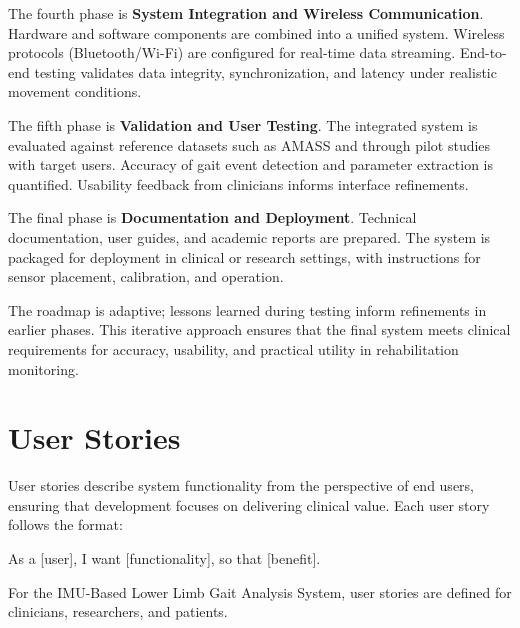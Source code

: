 \documentclass[12pt,a4paper]{report}
\begin{document}
The fourth phase is \textbf{System Integration and Wireless Communication}. Hardware and software components are combined into a unified system. Wireless protocols (Bluetooth/Wi-Fi) are configured for real-time data streaming. End-to-end testing validates data integrity, synchronization, and latency under realistic movement conditions.

The fifth phase is \textbf{Validation and User Testing}. The integrated system is evaluated against reference datasets such as AMASS and through pilot studies with target users. Accuracy of gait event detection and parameter extraction is quantified. Usability feedback from clinicians informs interface refinements.

The final phase is \textbf{Documentation and Deployment}. Technical documentation, user guides, and academic reports are prepared. The system is packaged for deployment in clinical or research settings, with instructions for sensor placement, calibration, and operation.

The roadmap is adaptive; lessons learned during testing inform refinements in earlier phases. This iterative approach ensures that the final system meets clinical requirements for accuracy, usability, and practical utility in rehabilitation monitoring.

\section{User Stories}


User stories describe system functionality from the perspective of end users, ensuring that development focuses on delivering clinical value. Each user story follows the format:

As a [user], I want [functionality], so that [benefit].

For the IMU-Based Lower Limb Gait Analysis System, user stories are defined for clinicians, researchers, and patients.
\end{document}
